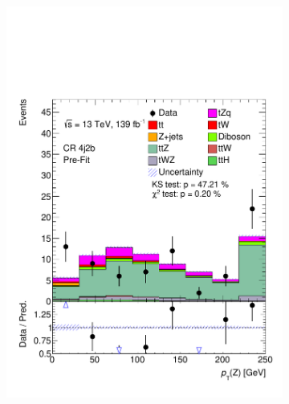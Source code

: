 \begin{figure}[!h] 
\vspace*{0.4cm}
  \begin{subfigure}[b]{0.33\linewidth}
    \centering
    \includegraphics[width=\linewidth]{ubonn-thesis/Chapters/Chapters_06/Figure/Input_distribution/CR_4j2b_Z_pt.pdf} 
  \end{subfigure} 
  \begin{subfigure}[b]{0.33\linewidth}
    \centering

\end{subfigure}
\end{figure}

